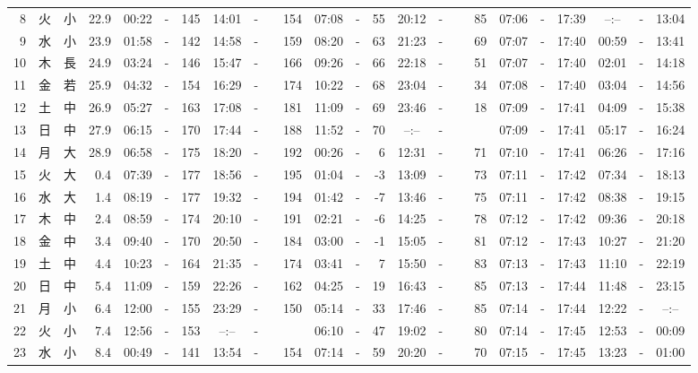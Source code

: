 \documentclass[12pt,a4j]{jsarticle}
\begin{document}
\begin{table}[htbp]
\begin{center}
{\begin{tabular}{|rc|cr|ccrccr|ccrccr|ccc|ccc|}
 8 & 火 & 小 & 22.9 &  00:22 &-& 145 &  14:01 &-& 154 &  07:08 &-&  55 &  20:12 &-&  85 & 07:06 & -& 17:39 & --:-- & -& 13:04 \\
 9 & 水 & 小 & 23.9 &  01:58 &-& 142 &  14:58 &-& 159 &  08:20 &-&  63 &  21:23 &-&  69 & 07:07 & -& 17:40 & 00:59 & -& 13:41 \\
10 & 木 & 長 & 24.9 &  03:24 &-& 146 &  15:47 &-& 166 &  09:26 &-&  66 &  22:18 &-&  51 & 07:07 & -& 17:40 & 02:01 & -& 14:18 \\
11 & 金 & 若 & 25.9 &  04:32 &-& 154 &  16:29 &-& 174 &  10:22 &-&  68 &  23:04 &-&  34 & 07:08 & -& 17:40 & 03:04 & -& 14:56 \\
12 & 土 & 中 & 26.9 &  05:27 &-& 163 &  17:08 &-& 181 &  11:09 &-&  69 &  23:46 &-&  18 & 07:09 & -& 17:41 & 04:09 & -& 15:38 \\
13 & 日 & 中 & 27.9 &  06:15 &-& 170 &  17:44 &-& 188 &  11:52 &-&  70 &  --:-- &-&~~~~~ & 07:09 & -& 17:41 & 05:17 & -& 16:24 \\
14 & 月 & 大 & 28.9 &  06:58 &-& 175 &  18:20 &-& 192 &  00:26 &-&   6 &  12:31 &-&  71 & 07:10 & -& 17:41 & 06:26 & -& 17:16 \\
15 & 火 & 大 &  0.4 &  07:39 &-& 177 &  18:56 &-& 195 &  01:04 &-&  -3 &  13:09 &-&  73 & 07:11 & -& 17:42 & 07:34 & -& 18:13 \\
16 & 水 & 大 &  1.4 &  08:19 &-& 177 &  19:32 &-& 194 &  01:42 &-&  -7 &  13:46 &-&  75 & 07:11 & -& 17:42 & 08:38 & -& 19:15 \\
17 & 木 & 中 &  2.4 &  08:59 &-& 174 &  20:10 &-& 191 &  02:21 &-&  -6 &  14:25 &-&  78 & 07:12 & -& 17:42 & 09:36 & -& 20:18 \\
18 & 金 & 中 &  3.4 &  09:40 &-& 170 &  20:50 &-& 184 &  03:00 &-&  -1 &  15:05 &-&  81 & 07:12 & -& 17:43 & 10:27 & -& 21:20 \\
19 & 土 & 中 &  4.4 &  10:23 &-& 164 &  21:35 &-& 174 &  03:41 &-&   7 &  15:50 &-&  83 & 07:13 & -& 17:43 & 11:10 & -& 22:19 \\
20 & 日 & 中 &  5.4 &  11:09 &-& 159 &  22:26 &-& 162 &  04:25 &-&  19 &  16:43 &-&  85 & 07:13 & -& 17:44 & 11:48 & -& 23:15 \\
21 & 月 & 小 &  6.4 &  12:00 &-& 155 &  23:29 &-& 150 &  05:14 &-&  33 &  17:46 &-&  85 & 07:14 & -& 17:44 & 12:22 & -& --:-- \\
22 & 火 & 小 &  7.4 &  12:56 &-& 153 &  --:-- &-&~~~~~ &  06:10 &-&  47 &  19:02 &-&  80 & 07:14 & -& 17:45 & 12:53 & -& 00:09 \\
23 & 水 & 小 &  8.4 &  00:49 &-& 141 &  13:54 &-& 154 &  07:14 &-&  59 &  20:20 &-&  70 & 07:15 & -& 17:45 & 13:23 & -& 01:00 \\

\end{tabular}}
\end{center}
\end{table}
\end{document}
